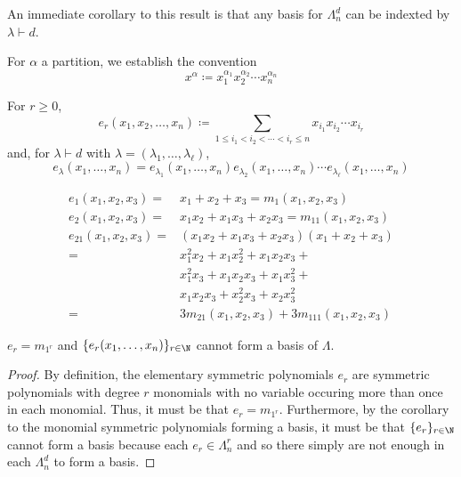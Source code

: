 \documentclass[11pt,leqno,oneside]{amsart}
\numberwithin{thm}{section}
\newcommand{\defeq}{\coloneqq}
\newcommand{\partitionof}{\vdash}
\newcommand{\sym}{\Lambda}
\begin{document}
\begin{cor}
  An immediate corollary to this result is that any basis for
  \(\sym_n^d\) can be indexted by \(\lambda \partitionof d\).
\end{cor}
\begin{defn}
  For \(\alpha\) a partition, we establish the convention \[
    x^\alpha \defeq x_1^{\alpha_1} x_2^{\alpha_2} \cdots x_n^{\alpha_n}
  \]
\end{defn}
\begin{defn}
  For \(r \geq 0\),  \[
    e_r(x_1, x_2, \ldots, x_n) \defeq \sum_{1 \leq i_1 < i_2 < \cdots < i_r
    \leq n} x_{i_1} x_{i_2} \cdots x_{i_r}
  \]
  and, for \(\lambda \partitionof d\) with \(\lambda = (\lambda_1,
  \ldots, \lambda_\ell)\), \[
    e_\lambda(x_1, \ldots, x_n) = e_{\lambda_1}(x_1, \ldots, x_n)
    e_{\lambda_2}(x_1, \ldots, x_n) \cdots e_{\lambda_\ell}(x_1,
    \ldots, x_n)
  \]
\end{defn}
\begin{example}
  \begin{align*}
    e_1(x_1, x_2, x_3) = & x_1+x_2+x_3 = m_1(x_1, x_2, x_3)\\
    e_2(x_1, x_2, x_3) = & x_1x_2+x_1x_3+x_2x_3 = m_{11}(x_1, x_2,
                         x_3)\\
    e_{21}(x_1,x_2,x_3) = & (x_1x_2+x_1x_3+x_2x_3)(x_1+x_2+x_3)\\
                       = & x_1^2x_2+x_1x_2^2+x_1x_2x_3+\\
                       & x_1^2x_3+x_1x_2x_3+x_1x_3^2+\\
                       & x_1x_2x_3+x_2^2x_3+x_2x_3^2\\
    = & 3m_{21}(x_1,x_2,x_3) + 3m_{111}(x_1,x_2,x_3)
  \end{align*}
\end{example}
\begin{prop}
  \(e_r = m_{1^r}\) and \(\{e_r(x_1, \ldots, x_n)\}_{r \in \N}\)
  cannot form a basis of \(\sym\).
\end{prop}
\begin{proof}
  By definition, the elementary symmetric polynomials \(e_r\) are
  symmetric polynomials with degree \(r\) monomials with no variable
  occuring more than once in each monomial. Thus, it must be that
  \(e_r = m_{1^r}\). Furthermore, by the corollary to the monomial
  symmetric polynomials forming a basis, it must be that \(\{e_r\}_{r
    \in \N}\) cannot form a basis because each \(e_r \in \sym_n^r\)
  and so there simply are not enough in each \(\sym_n^d\) to form a basis.
\end{proof}
\end{document}
